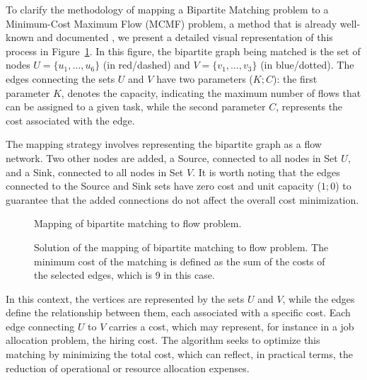             To clarify the methodology of mapping a Bipartite Matching problem to a Minimum-Cost Maximum Flow (MCMF) problem, a method that is already well-known and documented \cite{ahuja1993network, edmonds1972theoretical, tarjan1997dynamic}, we present a detailed visual representation of this process in Figure~\ref{fig:mcmf}.
            In this figure, the bipartite graph being matched is the set of nodes $U = \{u_1, \ldots, u_6\}$ (in red/dashed) and $V = \{v_1, \ldots, v_3\}$ (in blue/dotted). 
            The edges connecting the sets $U$ and $V$ have two parameters ($K;C$): the first parameter $K$, denotes the capacity, indicating the maximum number of flows that can be assigned to a given task, while the second parameter $C$, represents the cost associated with the edge. 

            The mapping strategy involves representing the bipartite graph as a flow network. 
            Two other nodes are added, a Source, connected to all nodes in Set $U$, and a Sink, connected to all nodes in Set $V$. 
            It is worth noting that the edges connected to the Source and Sink sets have zero cost and unit capacity ($1;0$) to guarantee that the added connections do not affect the overall cost minimization.
            
            \begin{figure}[ht] \centering
                
                \caption{Mapping of bipartite matching to flow problem.}
                \label{fig:mcmf} 
            \end{figure}
            
            \begin{figure}[ht] \centering 
                
                \caption[Solution of the mapping of bipartite matching to flow problem.]{Solution of the mapping of bipartite matching to flow problem. The minimum cost of the matching is defined as the sum of the costs of the selected edges, which is 9 in this case.}
                \label{fig:solucao_mcmf}
            \end{figure}
            
            In this context, the vertices are represented by the sets $U$ and $V$, while the edges define the relationship between them, each associated with a specific cost. 
            Each edge connecting $U$ to $V$ carries a cost, which may represent, for instance in a job allocation problem, the hiring cost. 
            The algorithm seeks to optimize this matching by minimizing the total cost, which can reflect, in practical terms, the reduction of operational or resource allocation expenses.
            
